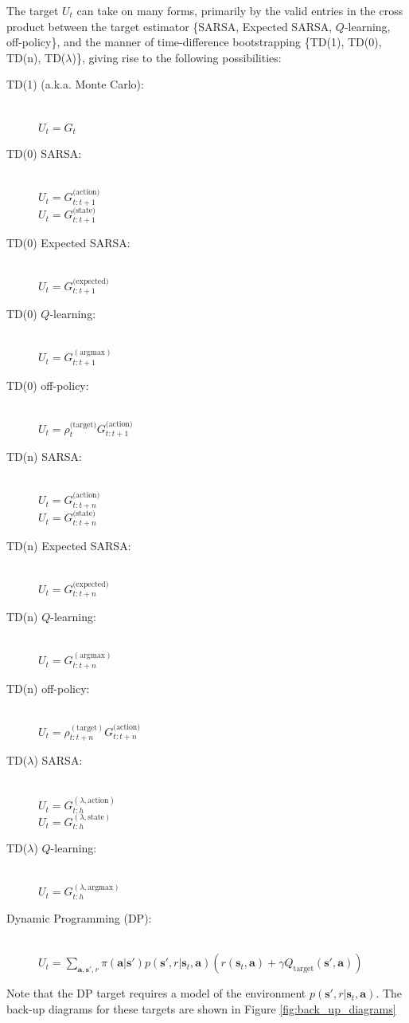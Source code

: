 \documentclass{article}
\begin{document}
The target $U_t$ can take on many forms, primarily by the valid entries in the cross product between the target estimator \{SARSA, Expected SARSA, $Q$-learning, off-policy\}, and the manner of time-difference bootstrapping \{TD(1), TD(0), TD(n), TD($\lambda$)\}, giving rise to the following possibilities:
 \begin{description}
\item[TD(1) (a.k.a. Monte Carlo):]\hfill \\ 
$U_t=G_t$
\item[TD(0) SARSA:]\hfill \\ 
$U_t=G_{t:t+1}^\text{(action)}$\\
$U_t=G_{t:t+1}^\text{(state)}$
\item[TD(0) Expected SARSA:]\hfill \\ 
$U_t=G_{t:t+1}^\text{(expected)}$
\item[TD(0) $Q$-learning:]\hfill \\ 
$U_t=G_{t:t+1}^{(\text{argmax})}$
\item[TD(0) off-policy:]\hfill \\ 
$U_t=\rho^\text{(target)}_{t}G_{t:t+1}^\text{(action)}$
\item[TD(n) SARSA:]\hfill \\
$U_t=G_{t:t+n}^\text{(action)}$\\
$U_t=G_{t:t+n}^\text{(state)}$
\item[TD(n) Expected SARSA:]\hfill \\
$U_t=G_{t:t+n}^\text{(expected)}$
\item[TD(n) $Q$-learning:]\hfill \\
$U_t=G_{t:t+n}^{(\text{argmax})}$
\item[TD(n) off-policy:]\hfill \\ 
$U_t=\rho_{t:t+n}^{(\text{target})}G_{t:t+n}^\text{(action)}$
\item[TD($\lambda$) SARSA:]\hfill \\ 
$U_t=G_{t:h}^{(\lambda,\text{action})}$\\
$U_t=G_{t:h}^{(\lambda,\text{state})}$
\item[TD($\lambda$) $Q$-learning:]\hfill \\ 
$U_t=G_{t:h}^{(\lambda,\text{argmax})}$
\item[Dynamic Programming (DP):]\hfill \\ 
$U_t=\sum_{\mathbf{a},\mathbf{s}',r}\pi(\mathbf{a}|\mathbf{s}')p(\mathbf{s}',r|\mathbf{s}_t,\mathbf{a})\left(r(\mathbf{s}_t,\mathbf{a})+\gamma Q_\text{target}(\mathbf{s}',\mathbf{a})\right)$
\end{description}Note that the DP target requires a model of the environment $p(\mathbf{s}',r|\mathbf{s}_t,\mathbf{a})$. The back-up diagrams for these targets are shown in Figure \ref{fig:back_up_diagrams}
\end{document}
